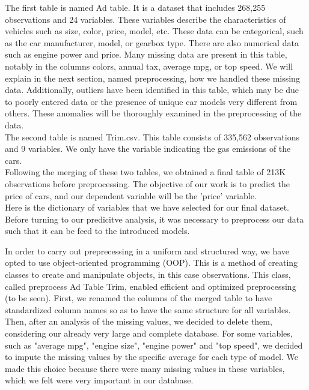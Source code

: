 \documentclass[12pt]{article}
\begin{document}
\noindent The first table is named Ad table. It is a dataset that includes 268,255 observations and 24 variables. These variables describe the characteristics of vehicles such as size, color, price, model, etc. These data can be categorical, such as the car manufacturer, model, or gearbox type. There are also numerical data such as engine power and price. Many missing data are present in this table, notably in the columns colors, annual tax, average mpg, or top speed. We will explain in the next section, named preprocessing, how we handled these missing data. Additionally, outliers have been identified in this table, which may be due to poorly entered data or the presence of unique car models very different from others. These anomalies will be thoroughly examined in the preprocessing of the data.\\

\noindent The second table is named Trim.csv. This table consists of 335,562 observations and 9 variables. We only have the variable indicating the gas emissions of the cars.\\

\noindent Following the merging of these two tables, we obtained a final table of 213K observations before preprocessing. The objective of our work is to predict the price of cars, and our dependent variable will be the 'price' variable.\\

\noindent Here is the dictionary of variables that we have selected for our final dataset.\\


\noindent Before turning to our predicitve analysis, it was necessary to preprocess our data such that it can be feed to the introduced models.

\noindent In order to carry out preprecessing in a uniform and structured way, we have opted to use object-oriented programming (OOP). This is a method of creating classes to create and manipulate objects, in this case observations. This class, called preprocess Ad Table Trim, enabled efficient and optimized preprocessing (to be seen). First, we renamed the columns of the merged table to have standardized column names so as to have the same structure for all variables. Then, after an analysis of the missing values, we decided to delete them, considering our already very large and complete database. For some variables, such as "average mpg", "engine size", "engine power" and "top speed", we decided to impute the missing values by the specific average for each type of model. We made this choice because there were many missing values in these variables, which we felt were very important in our database. \\
\end{document}
